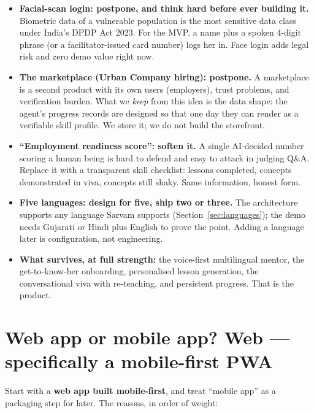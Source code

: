 \documentclass[11pt]{article}
\begin{document}
\begin{itemize}
  \item \textbf{Facial-scan login: postpone, and think hard before ever building it.} Biometric data of a vulnerable population is the most sensitive data class under India's DPDP Act 2023. For the MVP, a name plus a spoken 4-digit phrase (or a facilitator-issued card number) logs her in. Face login adds legal risk and zero demo value right now.
  \item \textbf{The marketplace (Urban Company hiring): postpone.} A marketplace is a second product with its own users (employers), trust problems, and verification burden. What we \emph{keep} from this idea is the data shape: the agent's progress records are designed so that one day they can render as a verifiable skill profile. We store it; we do not build the storefront.
  \item \textbf{``Employment readiness score'': soften it.} A single AI-decided number scoring a human being is hard to defend and easy to attack in judging Q\&A. Replace it with a transparent skill checklist: lessons completed, concepts demonstrated in viva, concepts still shaky. Same information, honest form.
  \item \textbf{Five languages: design for five, ship two or three.} The architecture supports any language Sarvam supports (Section~\ref{sec:languages}); the demo needs Gujarati or Hindi plus English to prove the point. Adding a language later is configuration, not engineering.
  \item \textbf{What survives, at full strength:} the voice-first multilingual mentor, the get-to-know-her onboarding, personalised lesson generation, the conversational viva with re-teaching, and persistent progress. That is the product.
\end{itemize}

\section{Web app or mobile app? Web --- specifically a mobile-first PWA}

Start with a \textbf{web app built mobile-first}, and treat ``mobile app'' as a packaging step for later. The reasons, in order of weight:
\end{document}
